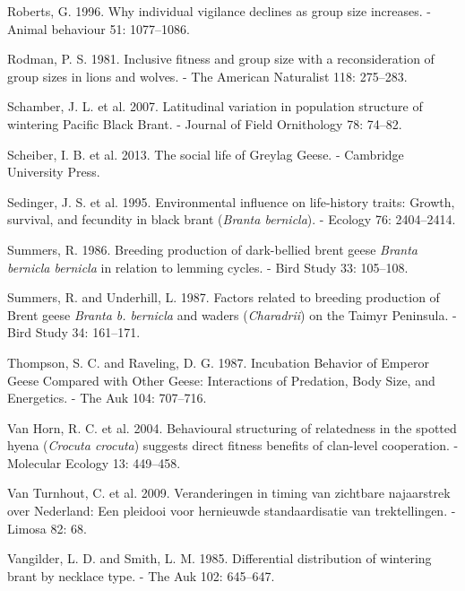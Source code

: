 \documentclass[10pt,twocolumn]{paper}
\begin{document}
\hypertarget{ref-roberts1996individual}{}
Roberts, G. 1996. Why individual vigilance declines as group size
increases. - Animal behaviour 51: 1077--1086.

\hypertarget{ref-rodman1981lions}{}
Rodman, P. S. 1981. Inclusive fitness and group size with a
reconsideration of group sizes in lions and wolves. - The American
Naturalist 118: 275--283.

\hypertarget{ref-JOFO:JOFO087}{}
Schamber, J. L. et al. 2007. Latitudinal variation in population
structure of wintering Pacific Black Brant. - Journal of Field
Ornithology 78: 74--82.

\hypertarget{ref-scheiber2013social}{}
Scheiber, I. B. et al. 2013. The social life of Greylag Geese. -
Cambridge University Press.

\hypertarget{ref-ECY:ECY19957682404}{}
Sedinger, J. S. et al. 1995. Environmental influence on life-history
traits: Growth, survival, and fecundity in black brant (\emph{Branta
bernicla}). - Ecology 76: 2404--2414.

\hypertarget{ref-summers1986breeding}{}
Summers, R. 1986. Breeding production of dark-bellied brent geese
\emph{Branta bernicla bernicla} in relation to lemming cycles. - Bird
Study 33: 105--108.

\hypertarget{ref-summers1987factors}{}
Summers, R. and Underhill, L. 1987. Factors related to breeding
production of Brent geese \emph{Branta b. bernicla} and waders
(\emph{Charadrii}) on the Taimyr Peninsula. - Bird Study 34: 161--171.

\hypertarget{ref-thompson1987emperor}{}
Thompson, S. C. and Raveling, D. G. 1987. Incubation Behavior of Emperor
Geese Compared with Other Geese: Interactions of Predation, Body Size,
and Energetics. - The Auk 104: 707--716.

\hypertarget{ref-MEC:MEC2071}{}
Van Horn, R. C. et al. 2004. Behavioural structuring of relatedness in
the spotted hyena (\emph{Crocuta crocuta}) suggests direct fitness
benefits of clan-level cooperation. - Molecular Ecology 13: 449--458.

\hypertarget{ref-van2009veranderingen}{}
Van Turnhout, C. et al. 2009. Veranderingen in timing van zichtbare
najaarstrek over Nederland: Een pleidooi voor hernieuwde standaardisatie
van trektellingen. - Limosa 82: 68.

\hypertarget{ref-vangilder1985differential}{}
Vangilder, L. D. and Smith, L. M. 1985. Differential distribution of
wintering brant by necklace type. - The Auk 102: 645--647.
\end{document}
